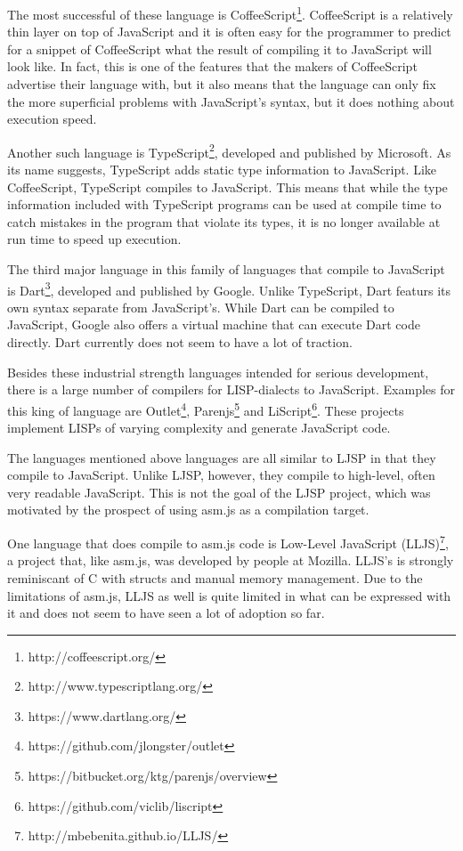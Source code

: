 \documentclass[11pt]{report}
\begin{document}
The most successful of these language is CoffeeScript\footnote{http://coffeescript.org/}. CoffeeScript is a relatively thin layer on top of JavaScript and it is often easy for the programmer to predict for a snippet of CoffeeScript what the result of compiling it to JavaScript will look like. In fact, this is one of the features that the makers of CoffeeScript advertise their language with, but it also means that the language can only fix the more superficial problems with JavaScript's syntax, but it does nothing about execution speed.

Another such language is TypeScript\footnote{http://www.typescriptlang.org/}, developed and published by Microsoft. As its name suggests, TypeScript adds static type information to JavaScript. Like CoffeeScript, TypeScript compiles to JavaScript. This means that while the type information included with TypeScript programs can be used at compile time to catch mistakes in the program that violate its types, it is no longer available at run time to speed up execution.

The third major language in this family of languages that compile to JavaScript is Dart\footnote{https://www.dartlang.org/}, developed and published by Google. Unlike TypeScript, Dart featurs its own syntax separate from JavaScript's. While Dart can be compiled to JavaScript, Google also offers a virtual machine that can execute Dart code directly. Dart currently does not seem to have a lot of traction.

Besides these industrial strength languages intended for serious development, there is a large number of compilers for LISP-dialects to JavaScript. Examples for this king of language are Outlet\footnote{https://github.com/jlongster/outlet}, Parenjs\footnote{https://bitbucket.org/ktg/parenjs/overview} and LiScript\footnote{https://github.com/viclib/liscript}. These projects implement LISPs of varying complexity and generate JavaScript code.

The languages mentioned above languages are all similar to LJSP in that they compile to JavaScript. Unlike LJSP, however, they compile to high-level, often very readable JavaScript. This is not the goal of the LJSP project, which was motivated by the prospect of using asm.js as a compilation target.

One language that does compile to asm.js code is Low-Level JavaScript (LLJS)\footnote{http://mbebenita.github.io/LLJS/}, a project that, like asm.js, was developed by people at Mozilla. LLJS's is strongly reminiscant of C with structs and manual memory management. Due to the limitations of asm.js, LLJS as well is quite limited in what can be expressed with it and does not seem to have seen a lot of adoption so far.
\end{document}
